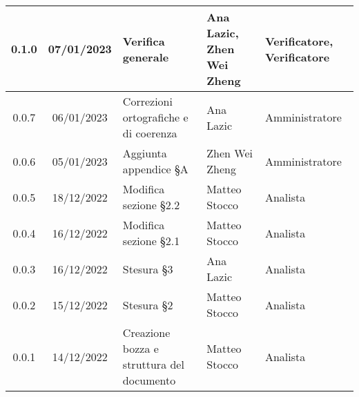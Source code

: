 \begin{center}
\begin{tabularx}{\textwidth}{| c | c | X | X | X |}
    \hline
	0.1.0 & 07/01/2023 & Verifica generale & Ana Lazic, Zhen Wei Zheng & Verificatore, Verificatore \\
    \hline
	0.0.7 & 06/01/2023 & Correzioni ortografiche e di coerenza & Ana Lazic & Amministratore \\
	\hline
	0.0.6 & 05/01/2023 & Aggiunta appendice §A & Zhen Wei Zheng & Amministratore \\
	\hline
	0.0.5 & 18/12/2022 & Modifica sezione §2.2 & Matteo Stocco & Analista \\
	\hline
	0.0.4 & 16/12/2022 & Modifica sezione §2.1 & Matteo Stocco & Analista \\
     \hline
	0.0.3 & 16/12/2022 & Stesura §3 & Ana Lazic & Analista \\
	\hline
	0.0.2 & 15/12/2022 & Stesura §2 & Matteo Stocco & Analista \\
	\hline
	0.0.1 & 14/12/2022 & Creazione bozza e struttura del documento & Matteo Stocco & Analista \\
	\hline
	\end{tabularx}
\end{center}
